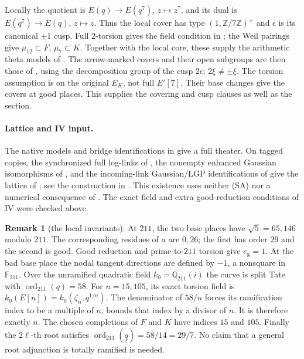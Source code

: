 \documentclass[11pt]{article}
\theoremstyle{plain}
\theoremstyle{definition}
\newtheorem{remark}{Remark}
\newcommand{\SA}{\textup{(SA)}}
\newcommand{\ord}{\operatorname{ord}}
\begin{document}
Locally the quotient is $E(q)\to E(q^7)$, $z\mapsto z^7$, and its dual
is $E(q^7)\to E(q)$, $z\mapsto z$.  Thus the local cover has type
$(1,\mathbb Z/7\mathbb Z)^\pm$ and $\epsilon$ is its canonical
$\pm1$ cusp.  Full $2$-torsion gives the field condition in
\cite[Def.~3.1(e)]{IUT1}; the Weil pairings give $\mu_{12}\subset F$,
$\mu_7\subset K$.  Together with the local core, these supply the
arithmetic theta models of \cite[Thm.~1.10(iii), Def.~2.5(i)]{EtTh}.
The arrow-marked covers and their open subgroups are then those of
\cite[\S1, Def.~1.1, Rem.~1.1.2]{IUT1}, using the decomposition group of
the cusp $2\epsilon$; $2\xi\ne\pm\xi$.  The torsion assumption is on
the original $E_K$, not full $E'[7]$.  Their base changes give the covers
at good places.  This supplies the covering and cusp clauses as well as
the section.

\paragraph{Lattice and IV input.}
The native models and bridge identifications in
\cite[Prop.~4.8(ii), Prop.~6.7, Def.~6.13]{IUT1} give a full theater.
On tagged copies, the synchronized full log-links of
\cite[Prop.~1.3]{IUT3}, the nonempty enhanced Gaussian isomorphisms of
\cite[Cor.~4.10(iii)]{IUT2}, and the incoming-link Gaussian/LGP
identifications of \cite[Prop.~3.7]{IUT3} give the lattice of
\cite[Def.~3.8(ii),(iii)]{IUT3}; see the construction in
\cite[\S4.6]{Firstfull}.  This existence uses neither \SA{} nor a numerical
consequence of \cite[Cor.~3.12]{IUT3}.  The exact field and extra
good-reduction conditions of IV were checked above.

\begin{remark}[the local invariants]\label{r:loc}
At $211$, the two base places have $\sqrt5=65,146$ modulo $211$.
The corresponding residues of $a$ are $0,26$; the first has order $29$
and the second is good.  Good reduction and prime-to-$211$ torsion give
$e_{\mathrm g}=1$.  At the bad base place the nodal tangent directions
are defined by $-1$, a nonsquare in $\mathbb F_{211}$.  Over the
unramified quadratic field $k_0=\mathbb Q_{211}(i)$ the curve is split
Tate with $\ord_{211}(q)=58$.  For $n=15,105$, its exact torsion field is
$k_0(E[n])=k_0(\zeta_n,q^{1/n})$.  The denominator of $58/n$ forces its
ramification index to be a multiple of $n$; \cite[Prop.~1.8(vii)]{IUT4}
bounds that index by a divisor of $n$.  It is therefore exactly $n$.
The chosen completions of $F$ and $K$ have indices $15$ and $105$.
Finally the $2\ell$-th root satisfies
$\ord_{211}(\underline{\underline q})=58/14=29/7$.
No claim that a general root adjunction is totally ramified is needed.
\end{remark}
\end{document}
